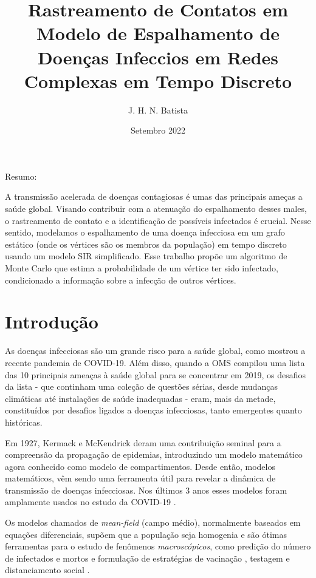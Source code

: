 \documentclass{article}
\title{Rastreamento de Contatos em Modelo de Espalhamento de Doenças Infeccios em Redes Complexas em Tempo Discreto}
\author{J. H. N. Batista}
\date{Setembro 2022}
\begin{document}
\maketitle

\begin{center}
    Resumo:
    
    A transmissão acelerada de doenças contagiosas é umas das principais ameças a saúde global. Visando contribuir com a atenuação do espalhamento desses males, o rastreamento de contato e a identificação de possíveis infectados é crucial. Nesse sentido, modelamos o espalhamento de uma doença infecciosa em um grafo estático (onde os vértices são os membros da população) em tempo discreto usando um modelo SIR simplificado. Esse trabalho propõe um algoritmo de Monte Carlo que estima a probabilidade de um vértice ter sido infectado, condicionado a informação sobre a infecção de outros vértices.
\end{center}

\section{Introdução}


As doenças infecciosas são um grande risco para a saúde global, como mostrou a recente pandemia de COVID-19. Além disso, quando a OMS compilou uma lista das 10 principais ameaças à saúde global para se concentrar em 2019, os desafios da lista - que continham uma coleção de questões sérias, desde mudanças climáticas até instalações de saúde inadequadas - eram, mais da metade, constituídos por desafios ligados a doenças infecciosas, tanto emergentes quanto históricas.

Em 1927, Kermack e McKendrick \cite{kermack1927} deram uma contribuição seminal para a compreensão da propagação de epidemias, introduzindo um modelo matemático agora conhecido como modelo de compartimentos. Desde então, modelos matemáticos, vêm sendo uma ferramenta útil para revelar a dinâmica de transmissão de doenças infecciosas. Nos últimos 3 anos esses modelos foram amplamente usados no estudo da COVID-19 \cite{massad, india, india2}. 

Os modelos chamados de \textit{mean-field} (campo médio), normalmente baseados em equações diferenciais, supõem que a população seja homogenia e são ótimas ferramentas para o estudo de fenômenos \textit{macroscópicos}, como predição do número de infectados e mortos \cite{india, india2} e formulação de estratégias de vacinação \cite{vacina}, testagem \cite{massad} e distanciamento social \cite{distancialmento}.
\end{document}
